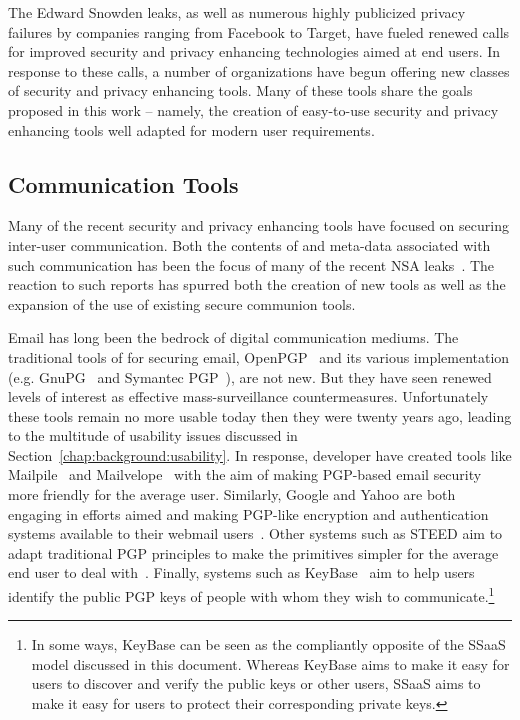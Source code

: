 The Edward Snowden leaks, as well as numerous highly publicized
privacy failures by companies ranging from Facebook to Target, have
fueled renewed calls for improved security and privacy enhancing
technologies aimed at end users. In response to these calls, a number
of organizations have begun offering new classes of security and
privacy enhancing tools. Many of these tools share the goals proposed
in this work -- namely, the creation of easy-to-use security and
privacy enhancing tools well adapted for modern user requirements.

\subsection{Communication Tools}

Many of the recent security and privacy enhancing tools have focused
on securing inter-user communication. Both the contents of and
meta-data associated with such communication has been the focus of
many of the recent NSA leaks~\cite{schneier-metadata}. The reaction to
such reports has spurred both the creation of new tools as well as the
expansion of the use of existing secure communion tools.

Email has long been the bedrock of digital communication mediums. The
traditional tools of for securing email, OpenPGP~\cite{openpgp} and
its various implementation (e.g. GnuPG~\cite{gnupg} and Symantec
PGP~\cite{pgp}), are not new. But they have seen renewed levels of
interest as effective mass-surveillance countermeasures. Unfortunately
these tools remain no more usable today then they were twenty years
ago, leading to the multitude of usability issues discussed in
Section~\ref{chap:background:usability}. In response, developer have
created tools like Mailpile~\cite{mailpile} and
Mailvelope~\cite{mailvelope} with the aim of making PGP-based email
security more friendly for the average user. Similarly, Google and
Yahoo are both engaging in efforts aimed and making PGP-like
encryption and authentication systems available to their webmail
users~\cite{google-endtoend, yahoo-endtoend}. Other systems such as
STEED aim to adapt traditional PGP principles to make the primitives
simpler for the average end user to deal
with~\cite{koch2011}. Finally, systems such as KeyBase~\cite{keybase}
aim to help users identify the public PGP keys of people with whom
they wish to communicate.\footnote{In some ways, KeyBase can be seen
  as the compliantly opposite of the SSaaS model discussed in this
  document. Whereas KeyBase aims to make it easy for users to discover
  and verify the public keys or other users, SSaaS aims to make it
  easy for users to protect their corresponding private keys.}

